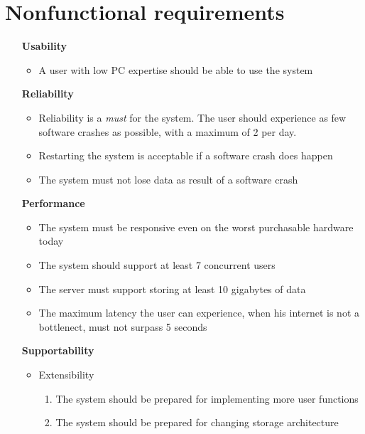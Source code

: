 \section{Nonfunctional requirements}

\begin{itemize}

\item[\textbf{Usability}]
\begin{itemize}
\item A user with low PC expertise should be able to use the system
\end{itemize}

\vspace{0.2cm}
\item[\textbf{Reliability}]
\begin{itemize}
\item Reliability is a \textit{must} for the system. The user should experience as few software crashes as possible, with a maximum of 2 per day.
\item Restarting the system is acceptable if a software crash does happen
\item The system must not lose data as result of a software crash
\end{itemize}

\vspace{0.2cm}
\item[\textbf{Performance}]
\begin{itemize}
\item The system must be responsive even on the worst purchasable hardware today
\item The system should support at least 7 concurrent users
\item The server must support storing at least 10 gigabytes of data
\item The maximum latency the user can experience, when his internet is not a bottlenect, must not surpass 5 seconds
\end{itemize}

\vspace{0.2cm}
\item[\textbf{Supportability}]
\begin{itemize}
\item Extensibility
\begin{enumerate}
\item The system should be prepared for implementing more user functions
\item The system should be prepared for changing storage architecture
\end{enumerate}
\end{itemize}


\end{itemize}
